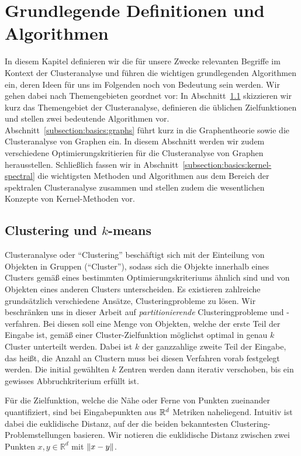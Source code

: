 \section{Grundlegende Definitionen und Algorithmen}
\label{section:basics}

In diesem Kapitel definieren wir die für unsere Zwecke relevanten Begriffe im Kontext der Clusteranalyse und führen die
wichtigen grundlegenden Algorithmen ein, deren Ideen für uns im Folgenden noch von Bedeutung sein werden. Wir gehen dabei
nach Themengebieten geordnet vor: In Abschnitt~\ref{subsection:basics:clustering} skizzieren wir kurz das
Themengebiet der Clusteranalyse, definieren die üblichen Zielfunktionen und stellen zwei bedeutende Algorithmen vor.
Abschnitt~\ref{subsection:basics:graphs} führt kurz in die Graphentheorie sowie die Clusteranalyse von Graphen ein. In diesem
Abschnitt werden wir zudem verschiedene Optimierungskritierien für die
Clusteranalyse von Graphen herausstellen. Schließlich fassen wir in Abschnitt~\ref{subsection:basics:kernel-spectral} die
wichtigsten Methoden und Algorithmen aus dem Bereich der spektralen Clusteranalyse zusammen und stellen zudem die wesentlichen
Konzepte von Kernel-Methoden vor.

\subsection{Clustering und \texorpdfstring{$k$}{k}-means}
\label{subsection:basics:clustering}

Clusteranalyse oder "`Clustering"' beschäftigt sich mit der Einteilung von Objekten in Gruppen ("`Cluster"'), sodass
sich die Objekte innerhalb eines Clusters gemäß eines bestimmten Optimierungskriteriums ähnlich sind und von Objekten eines
anderen Clusters unterscheiden. Es existieren zahlreiche grundsätzlich verschiedene Ansätze, Clusteringprobleme zu lösen.
Wir beschränken uns in dieser Arbeit auf \emph{partitionierende} Clusteringprobleme und -verfahren. Bei diesen
soll eine Menge von Objekten, welche der erste Teil der Eingabe ist, gemäß einer Cluster-Zielfunktion möglichst
optimal in genau $k$ Cluster unterteilt werden. Dabei ist $k$ der ganzzahlige zweite Teil der Eingabe, das heißt, die
Anzahl an Clustern muss bei diesen Verfahren vorab festgelegt werden. Die initial gewählten $k$ Zentren werden dann iterativ
verschoben, bis ein gewisses Abbruchkriterium erfüllt ist.

Für die Zielfunktion, welche die Nähe oder Ferne von Punkten zueinander quantifiziert, sind bei Eingabepunkten aus
$\mathbb{R}^{d}$ Metriken naheliegend. Intuitiv ist dabei die euklidische Distanz, auf der die beiden bekanntesten
Clustering-Problemstellungen basieren. Wir notieren die euklidische Distanz zwischen zwei Punkten $x, y \in \mathbb{R}^d$ mit
$\lVert {x} - {y} \rVert$.

